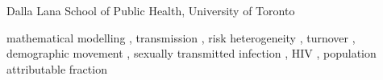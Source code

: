 \begin{frontmatter}
{  Dalla Lana School of Public Health, University of Toronto}
\address[IMS]{Instituof Medical Sciences, University of Toronto}
\begin{abstract}
  
\end{abstract}
\begin{keyword}
  mathematical modelling \sep
  transmission \sep
  risk heterogeneity \sep
  turnover \sep
  demographic movement \sep
  sexually transmitted infection \sep
  HIV \sep
  population attributable fraction
\end{keyword}
\end{frontmatter}
\clearpage
{}
\setcounter{tocdepth}{2}
\tableofcontents
\clearpage
{}
\setcounter{page}{1}

